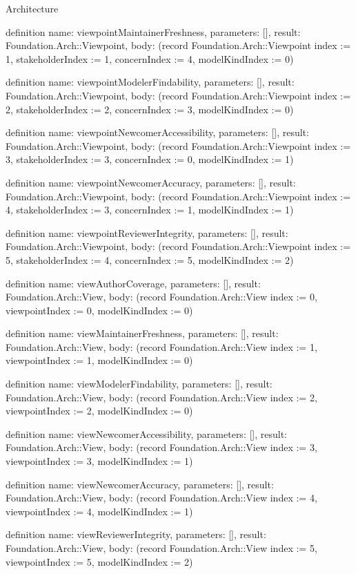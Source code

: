 \begin{lexlean}{Architecture}
\begin{semanticmodule}
definition{
  name: viewpointMaintainerFreshness,
  parameters: [],
  result: Foundation.Arch::Viewpoint,
  body: (record Foundation.Arch::Viewpoint {index := 1, stakeholderIndex := 1, concernIndex := 4, modelKindIndex := 0})
}

definition{
  name: viewpointModelerFindability,
  parameters: [],
  result: Foundation.Arch::Viewpoint,
  body: (record Foundation.Arch::Viewpoint {index := 2, stakeholderIndex := 2, concernIndex := 3, modelKindIndex := 0})
}

definition{
  name: viewpointNewcomerAccessibility,
  parameters: [],
  result: Foundation.Arch::Viewpoint,
  body: (record Foundation.Arch::Viewpoint {index := 3, stakeholderIndex := 3, concernIndex := 0, modelKindIndex := 1})
}

definition{
  name: viewpointNewcomerAccuracy,
  parameters: [],
  result: Foundation.Arch::Viewpoint,
  body: (record Foundation.Arch::Viewpoint {index := 4, stakeholderIndex := 3, concernIndex := 1, modelKindIndex := 1})
}

definition{
  name: viewpointReviewerIntegrity,
  parameters: [],
  result: Foundation.Arch::Viewpoint,
  body: (record Foundation.Arch::Viewpoint {index := 5, stakeholderIndex := 4, concernIndex := 5, modelKindIndex := 2})
}

definition{
  name: viewAuthorCoverage,
  parameters: [],
  result: Foundation.Arch::View,
  body: (record Foundation.Arch::View {index := 0, viewpointIndex := 0, modelKindIndex := 0})
}

definition{
  name: viewMaintainerFreshness,
  parameters: [],
  result: Foundation.Arch::View,
  body: (record Foundation.Arch::View {index := 1, viewpointIndex := 1, modelKindIndex := 0})
}

definition{
  name: viewModelerFindability,
  parameters: [],
  result: Foundation.Arch::View,
  body: (record Foundation.Arch::View {index := 2, viewpointIndex := 2, modelKindIndex := 0})
}

definition{
  name: viewNewcomerAccessibility,
  parameters: [],
  result: Foundation.Arch::View,
  body: (record Foundation.Arch::View {index := 3, viewpointIndex := 3, modelKindIndex := 1})
}

definition{
  name: viewNewcomerAccuracy,
  parameters: [],
  result: Foundation.Arch::View,
  body: (record Foundation.Arch::View {index := 4, viewpointIndex := 4, modelKindIndex := 1})
}

definition{
  name: viewReviewerIntegrity,
  parameters: [],
  result: Foundation.Arch::View,
  body: (record Foundation.Arch::View {index := 5, viewpointIndex := 5, modelKindIndex := 2})
}


\end{semanticmodule}
\end{lexlean}
